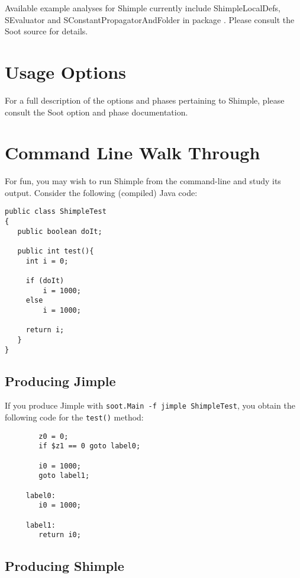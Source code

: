\documentclass[10pt,letterpaper,oneside,onecolumn]{article}
\begin{document}
Available example analyses for Shimple currently include
ShimpleLocalDefs, SEvaluator and SConstantPropagatorAndFolder in
package
.
Please consult the Soot source for details.

\section{Usage Options}

For a full description of the options and phases pertaining to
Shimple, please consult the
Soot option and phase documentation.

\section{Command Line Walk Through}

For fun, you may wish to run Shimple from the command-line and study
its output.  Consider the following (compiled) Java code:

\begin{verbatim}
public class ShimpleTest
{
   public boolean doIt;

   public int test(){
     int i = 0;

     if (doIt)
         i = 1000;
     else
         i = 1000;

     return i;
   }
}
\end{verbatim}

\subsection{Producing Jimple}

If you produce Jimple with 
{\tt soot.Main -f jimple ShimpleTest}, you obtain the following code
for the {\tt test()} method:

\begin{verbatim}
        z0 = 0;
        if $z1 == 0 goto label0;

        i0 = 1000;
        goto label1;

     label0:
        i0 = 1000;

     label1:
        return i0;
\end{verbatim}

\subsection{Producing Shimple}
\end{document}
